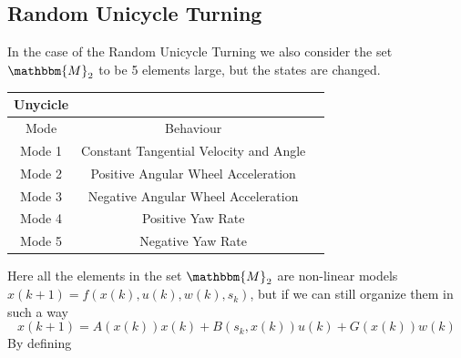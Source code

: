 \documentclass[twocolumn]{article}
\begin{document}
\subsection*{Random Unicycle Turning}
In the case of the Random Unicycle Turning we also consider the set $\mathbbm{M}_{2}$ to be 5 elements large, but the states are changed.
\begin{center}
    \begin{tabular}{||c||c |c |}%
        \hline
        Unycicle                                        \\
        \hline\hline
        Mode   & Behaviour                              \\ [0.5ex]
        \hline\hline
        Mode 1 & Constant Tangential Velocity and Angle \\
        \hline
        Mode 2 & Positive Angular Wheel Acceleration    \\
        \hline
        Mode 3 & Negative Angular Wheel Acceleration    \\
        \hline
        Mode 4 & Positive Yaw Rate                      \\
        \hline
        Mode 5 & Negative Yaw Rate                      \\ [1ex]
        \hline
    \end{tabular}
\end{center}
Here all the elements in the set $\mathbbm{M}_{2}$ are non-linear models $x(k+1)=f(x(k),u(k),w(k),s_{k})$, but if we can still organize them in such a way
\begin{equation*}
    x(k+1)= A(x(k))x(k) + B(s_{k},x(k))u(k) + G(x(k))w(k)
\end{equation*}
By defining
\end{document}
